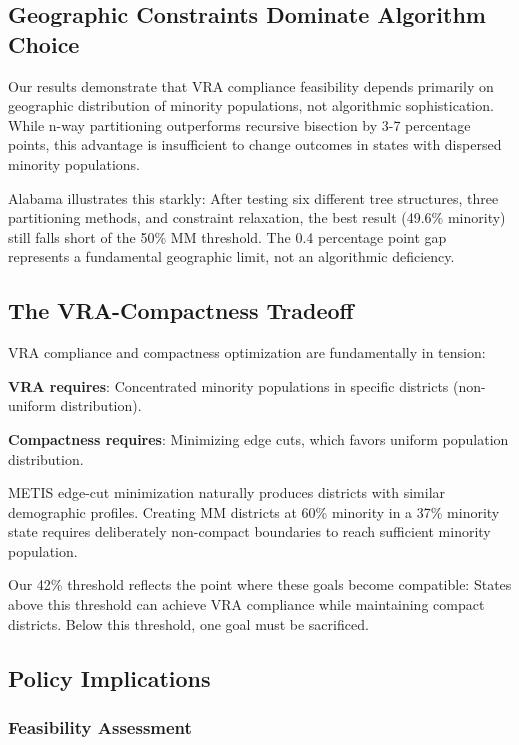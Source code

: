 \subsection{Geographic Constraints Dominate Algorithm Choice}

Our results demonstrate that VRA compliance feasibility depends primarily on geographic distribution of minority populations, not algorithmic sophistication. While n-way partitioning outperforms recursive bisection by 3-7 percentage points, this advantage is insufficient to change outcomes in states with dispersed minority populations.

Alabama illustrates this starkly: After testing six different tree structures, three partitioning methods, and constraint relaxation, the best result (49.6\% minority) still falls short of the 50\% MM threshold. The 0.4 percentage point gap represents a fundamental geographic limit, not an algorithmic deficiency.

\subsection{The VRA-Compactness Tradeoff}

VRA compliance and compactness optimization are fundamentally in tension:

\textbf{VRA requires}: Concentrated minority populations in specific districts (non-uniform distribution).

\textbf{Compactness requires}: Minimizing edge cuts, which favors uniform population distribution.

METIS edge-cut minimization naturally produces districts with similar demographic profiles. Creating MM districts at 60\% minority in a 37\% minority state requires deliberately non-compact boundaries to reach sufficient minority population.

Our 42\% threshold reflects the point where these goals become compatible: States above this threshold can achieve VRA compliance while maintaining compact districts. Below this threshold, one goal must be sacrificed.

\subsection{Policy Implications}

\subsubsection{Feasibility Assessment}

